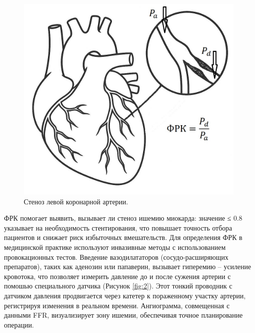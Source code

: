 \begin{figure}
	\centering
	\includegraphics[]{images/chap1/FFR_dem.jpg}
	\caption{Стеноз левой коронарной артерии.}
	\label{fig:1}
\end{figure}

ФРК помогает выявить, вызывает ли стеноз ишемию миокарда: значение ≤ 0.8 указывает на необходимость стентирования, что повышает точность отбора пациентов и снижает риск избыточных вмешательств. Для определения ФРК в медицинской практике используют инвазивные методы с использованием провокационных тестов. Введение вазодилататоров (сосудо-расширяющих препаратов), таких как аденозин или папаверин, вызывает гиперемию -- усиление кровотока, что позволяет измерить давление до и после сужения артерии с помошью специального датчика (Рисунок {\ref*{fig:2}}). Этот тонкий проводник с датчиком давления продвигается через катетер к пораженному участку артерии, регистрируя изменения в реальном времени. Ангиограмма, совмещенная с данными FFR, визуализирует зону ишемии, обеспечивая точное планирование операции.

